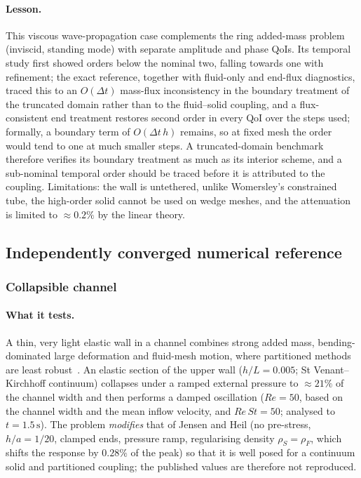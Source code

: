 \paragraph{Lesson.}
This viscous wave-propagation case complements the ring added-mass problem (inviscid, standing mode) with separate amplitude and phase QoIs.
Its temporal study first showed orders below the nominal two, falling towards one with refinement; the exact reference, together with fluid-only and end-flux diagnostics, traced this to an $O(\Delta t)$ mass-flux inconsistency in the boundary treatment of the truncated domain rather than to the fluid--solid coupling, and a flux-consistent end treatment restores second order in every QoI over the steps used; formally, a boundary term of $O(\Delta t\,h)$ remains, so at fixed mesh the order would tend to one at much smaller steps.
A truncated-domain benchmark therefore verifies its boundary treatment as much as its interior scheme, and a sub-nominal temporal order should be traced before it is attributed to the coupling.
Limitations: the wall is untethered, unlike Womersley's constrained tube, the high-order solid cannot be used on wedge meshes, and the attenuation is limited to $\approx0.2\%$ by the linear theory.


\subsection{Independently converged numerical reference}\label{sec:independent_refs}

\subsubsection{Collapsible channel}\label{sec:collapsible}

\paragraph{What it tests.}
A thin, very light elastic wall in a channel combines strong added mass, bending-dominated large deformation and fluid-mesh motion, where partitioned methods are least robust~\citep{Jensen2003, Heil2004, Heil2008}.
An elastic section of the upper wall ($h/L = 0.005$; St Venant--Kirchhoff continuum) collapses under a ramped external pressure to $\approx21\%$ of the channel width and then performs a damped oscillation ($Re = 50$, based on the channel width and the mean inflow velocity, and $Re\,St = 50$; analysed to $t = 1.5\,\mathrm{s}$).
The problem \emph{modifies} that of Jensen and Heil (no pre-stress, $h/a = 1/20$, clamped ends, pressure ramp, regularising density $\rho_S = \rho_F$, which shifts the response by $0.28\%$ of the peak) so that it is well posed for a continuum solid and partitioned coupling; the published values are therefore not reproduced.

